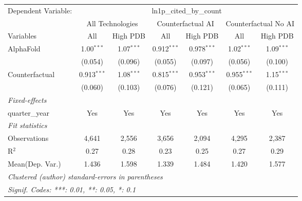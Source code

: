 \begingroup
\centering
\begin{tabular}{lcccccc}
   \tabularnewline \midrule \midrule
   Dependent Variable: & \multicolumn{6}{c}{ln1p\_cited\_by\_count}\\
 & \multicolumn{2}{c}{All Technologies} & \multicolumn{2}{c}{Counterfactual AI} & \multicolumn{2}{c}{Counterfactual No AI} \\
\cmidrule(lr){1-1}\cmidrule(lr){2-3} \cmidrule(lr){4-5} \cmidrule(lr){6-7}
Variables & \multicolumn{1}{c}{All} & \multicolumn{1}{c}{High PDB} & \multicolumn{1}{c}{All} & \multicolumn{1}{c}{High PDB} & \multicolumn{1}{c}{All} & \multicolumn{1}{c}{High PDB} \\
\cmidrule(lr){1-1}\cmidrule(lr){2-2} \cmidrule(lr){3-3} \cmidrule(lr){4-4} \cmidrule(lr){5-5} \cmidrule(lr){6-6} \cmidrule(lr){7-7}
   AlphaFold      & 1.00$^{***}$  & 1.07$^{***}$ & 0.912$^{***}$ & 0.978$^{***}$ & 1.02$^{***}$  & 1.09$^{***}$\\   
                  & (0.054)       & (0.096)      & (0.055)       & (0.097)       & (0.056)       & (0.100)\\   
   Counterfactual & 0.913$^{***}$ & 1.08$^{***}$ & 0.815$^{***}$ & 0.953$^{***}$ & 0.955$^{***}$ & 1.15$^{***}$\\   
                  & (0.060)       & (0.103)      & (0.076)       & (0.121)       & (0.065)       & (0.111)\\   
   \midrule
   \emph{Fixed-effects}\\
   quarter\_year  & Yes           & Yes          & Yes           & Yes           & Yes           & Yes\\  
   \midrule
   \emph{Fit statistics}\\
   Observations   & 4,641         & 2,556        & 3,656         & 2,094         & 4,295         & 2,387\\  
   R$^2$          & 0.27          & 0.28         & 0.23          & 0.25          & 0.27          & 0.29\\  
Mean(Dep. Var.) & 1.436 & 1.598 & 1.339 & 1.484 & 1.420 & 1.577 \\
   \midrule \midrule
   \multicolumn{7}{l}{\emph{Clustered (author) standard-errors in parentheses}}\\
   \multicolumn{7}{l}{\emph{Signif. Codes: ***: 0.01, **: 0.05, *: 0.1}}\\
\end{tabular}
\par\endgroup
